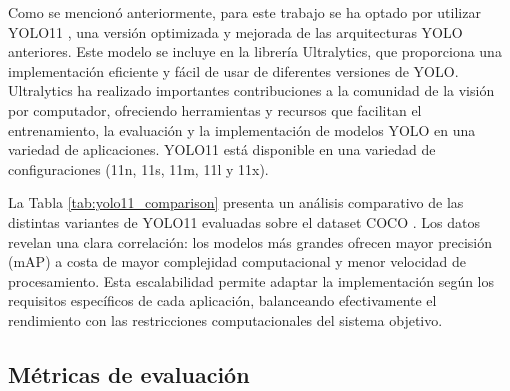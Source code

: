 \documentclass[11pt,spanish,listoffigures,listoftables]{tfgetsinf}
\begin{document}
Como se mencionó anteriormente, para este trabajo se ha optado por utilizar YOLO11 \cite{yolo11_ultralytics}, una versión optimizada y mejorada de las arquitecturas YOLO anteriores. Este modelo se incluye en la librería Ultralytics, que proporciona una implementación eficiente y fácil de usar de diferentes versiones de YOLO. Ultralytics ha realizado importantes contribuciones a la comunidad de la visión por computador, ofreciendo herramientas y recursos que facilitan el entrenamiento, la evaluación y la implementación de modelos YOLO en una variedad de aplicaciones.
YOLO11 está disponible en una variedad de configuraciones (11n, 11s, 11m, 11l y 11x).
\begin{table}[H]
   \centering
   \caption{Análisis comparativo de las variantes de YOLO11 considerando precisión, velocidad y complejidad computacional.}
   \label{tab:yolo11_comparison}
\end{table}

La Tabla \ref{tab:yolo11_comparison} presenta un análisis comparativo de las distintas variantes de YOLO11 evaluadas sobre el dataset COCO \cite{lin2015microsoftcococommonobjects}. Los datos revelan una clara correlación: los modelos más grandes ofrecen mayor precisión (mAP) a costa de mayor complejidad computacional y menor velocidad de procesamiento. Esta escalabilidad permite adaptar la implementación según los requisitos específicos de cada aplicación, balanceando efectivamente el rendimiento con las restricciones computacionales del sistema objetivo.

\subsection{Métricas de evaluación}
\end{document}
